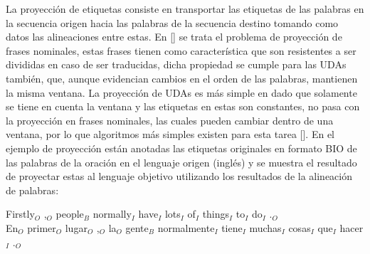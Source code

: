 La proyección de etiquetas consiste en transportar las etiquetas de las palabras en la secuencia origen
hacia las palabras de la secuencia destino tomando como datos las alineaciones entre estas. En [\cite{yarowsky2001inducing}]
se trata el problema de proyección de frases nominales, estas frases tienen como característica que son resistentes
a ser divididas en caso de ser traducidas, dicha propiedad se cumple para las UDAs también, que, aunque evidencian 
cambios en el orden de las palabras, mantienen la misma ventana. La proyección de UDAs es más simple en dado
que solamente se tiene en cuenta la ventana y las etiquetas en estas son constantes, no pasa con la proyección en
frases nominales, las cuales pueden cambiar dentro de una ventana, por lo que algoritmos más simples existen
para esta tarea [\cite{eger2018cross}]. En el ejemplo de proyección están anotadas las etiquetas originales en formato BIO
de las palabras de la oración en el lenguaje origen (inglés) y se muestra el
resultado de proyectar estas al lenguaje objetivo utilizando los resultados de la alineación de palabras:

\begin{adjustwidth}{25pt}{25pt}
	Firstly$_O$ ,$_O$ people$_B$ normally$_I$ have$_I$ lots$_I$ of$_I$ things$_I$ to$_I$ do$_I$ .$_O$ \\
	En$_O$ primer$_O$ lugar$_O$ ,$_O$ la$_O$ gente$_B$ normalmente$_I$ tiene$_I$ muchas$_I$ cosas$_I$ que$_I$ hacer$_I$ .$_O$
\end{adjustwidth}
